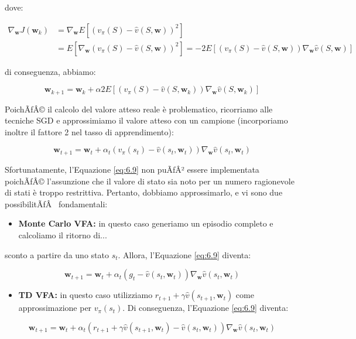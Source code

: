 ﻿\documentclass[11pt, a4paper]{report}
\begin{document}
dove:

\begin{align*}
\nabla_{\bm{w}} J(\bm{w}_k) &= \nabla_{\bm{w}} E[(v_\pi(S) - \hat{v}(S, \bm{w}))^2] \\
&= E[\nabla_{\bm{w}}(v_\pi(S) - \hat{v}(S, \bm{w}))^2] = -2E[(v_\pi(S) - \hat{v}(S, \bm{w}))\nabla_{\bm{w}}\hat{v}(S, \bm{w})] \tag{6.7}
\end{align*}

di conseguenza, abbiamo:

\[
\bm{w}_{k+1} = \bm{w}_k + \alpha 2 E[(v_\pi(S) - \hat{v}(S, \bm{w}_k))\nabla_{\bm{w}}\hat{v}(S, \bm{w}_k)] \tag{6.8}
\]

PoichÃƒÂ© il calcolo del valore atteso reale è problematico, ricorriamo alle tecniche SGD e approssimiamo il valore atteso con un campione (incorporiamo inoltre il fattore 2 nel tasso di apprendimento):

\[
\bm{w}_{t+1} = \bm{w}_t + \alpha_t (v_\pi(s_t) - \hat{v}(s_t, \bm{w}_t))\nabla_{\bm{w}}\hat{v}(s_t, \bm{w}_t) \tag{6.9}
\]

Sfortunatamente, l'Equazione \eqref{eq:6.9} non puÃƒÂ² essere implementata poichÃƒÂ© l'assunzione che il valore di stato sia noto per un numero ragionevole di stati è troppo restrittiva. Pertanto, dobbiamo approssimarlo, e vi sono due possibilitÃƒÂ  fondamentali:

\begin{itemize}
    \item \textbf{Monte Carlo VFA:} in questo caso generiamo un episodio completo e calcoliamo il ritorno di...
\end{itemize}

\newpage

sconto a partire da uno stato $s_t$. Allora, l'Equazione \eqref{eq:6.9} diventa:

\[
\bm{w}_{t+1} = \bm{w}_t + \alpha_t (g_t - \hat{v}(s_t, \bm{w}_t))\nabla_{\bm{w}}\hat{v}(s_t, \bm{w}_t) \tag{6.10}
\]

\begin{itemize}
    \item \textbf{TD VFA:} in questo caso utilizziamo $r_{t+1} + \gamma \hat{v}(s_{t+1}, \bm{w}_t)$ come approssimazione per $v_\pi(s_t)$. Di conseguenza, l'Equazione \eqref{eq:6.9} diventa:
\end{itemize}

\[
\bm{w}_{t+1} = \bm{w}_t + \alpha_t (r_{t+1} + \gamma \hat{v}(s_{t+1}, \bm{w}_t) - \hat{v}(s_t, \bm{w}_t))\nabla_{\bm{w}}\hat{v}(s_t, \bm{w}_t) \tag{6.11}
\]
\end{document}
